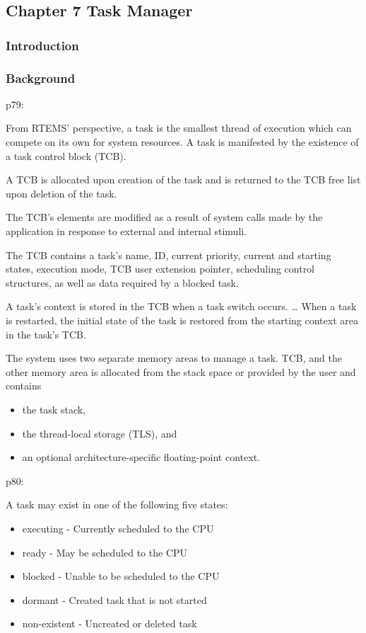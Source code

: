 \subsection{Chapter 7 Task Manager}

\subsubsection{Introduction}


\subsubsection{Background}

p79:

From RTEMS’ perspective,
a task is the smallest thread of execution
which can compete on its own for system resources.
A task is manifested by the existence of a task control block (TCB).

A TCB is allocated upon creation of the task and is returned to
the TCB free list upon deletion of the task.

The TCB’s elements are modified as a result of system calls
made by the application in response to external and internal stimuli.

The TCB contains a task’s name,
ID, current priority, current and starting states, execution mode, TCB user extension pointer,
scheduling control structures, as well as data required by a blocked task.

A task’s context is stored in the TCB when a task switch occurs.
\dots
When a task is restarted,
the initial state of the task is restored
from the starting context area in the task’s TCB.

The system uses two separate memory areas to manage a task. TCB, and
the other memory area is allocated from the stack space or provided
by the user and contains
\begin{itemize}
  \item
    the task stack,
  \item
    the thread-local storage (TLS), and
  \item
    an optional architecture-specific floating-point context.
\end{itemize}

p80:

A task may exist in one of the following five states:
\begin{itemize}
  \item
    executing - Currently scheduled to the CPU
  \item
    ready - May be scheduled to the CPU
  \item
    blocked - Unable to be scheduled to the CPU
  \item
    dormant - Created task that is not started
  \item
    non-existent - Uncreated or deleted task
\end{itemize}

